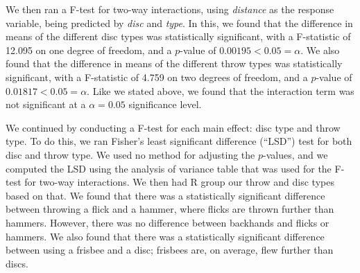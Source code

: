 \documentclass[letter,12pt]{article}
\begin{document}
  We then ran a F-test for two-way interactions, using \textit{distance} as the response variable, being predicted by \textit{disc} and \textit{type}. In this, we found that the difference in means of the different disc types was statistically significant, with a F-statistic of 12.095 on one degree of freedom, and a $p$-value of $0.00195 < 0.05 = \alpha$. We also found that the difference in means of the different throw types was statistically significant, with a F-statistic of 4.759 on two degrees of freedom, and a $p$-value of $0.01817 < 0.05 = \alpha$. Like we stated above, we found that the interaction term was not significant at a $\alpha = 0.05$ significance level.\par
  We continued by conducting a F-test for each main effect: disc type and throw type. To do this, we ran Fisher’s least significant difference (“LSD”) test for both disc and throw type. We used no method for adjusting the $p$-values, and we computed the LSD using the analysis of variance table that was used for the F-test for two-way interactions. We then had R group our throw and disc types based on that. We found that there was a statistically significant difference between throwing a flick and a hammer, where flicks are thrown further than hammers. However, there was no difference between backhands and flicks or hammers. We also found that there was a statistically significant difference between using a frisbee and a disc; frisbees are, on average, flew further than discs.\par
	
\end{document}
